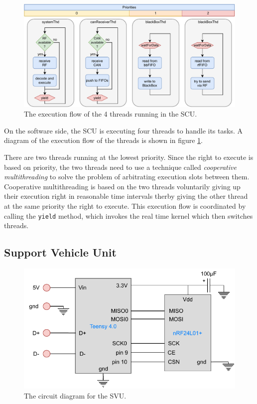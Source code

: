 \documentclass[conference]{IEEEtran}
\begin{document}
\begin{figure}
    \centering
    \includegraphics[width=\linewidth]{documentation/images/SCU_threads.pdf}
    \caption{The execution flow of the 4 threads running in the SCU.}
    \label{fig:SCU_threads}
\end{figure}

On the software side, the SCU is executing four threads to handle its tasks. A diagram of the execution flow of the threads is shown in figure \ref{fig:SCU_threads}. 

There are two threads running at the lowest priority. Since the right to execute is based on priority, the two threads need to use a technique called \textit{cooperative multithreading} to solve the problem of arbitrating execution slots between them. Cooperative multithreading is based on the two threads voluntarily giving up their execution right in reasonable time intervals therby giving the other thread at the same priority the right to execute. This execution flow is coordinated by calling the \texttt{yield} method, which invokes the real time kernel which then switches threads. 




\subsection{Support Vehicle Unit}
\begin{figure}
    \centering
    \includegraphics[width=\linewidth]{documentation/images/SVU_CircuitDiagram.pdf}
    \caption{The circuit diagram for the SVU.}
    \label{fig:SCU_circuit}
\end{figure}
\end{document}
